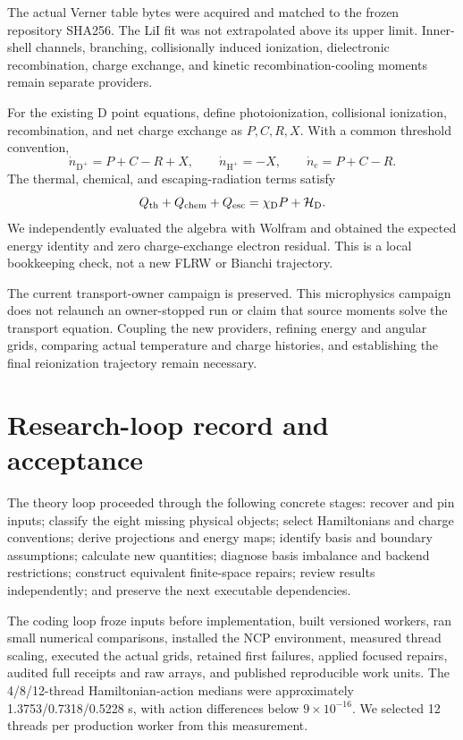 \documentclass[
  10pt,
]{article}
\begin{document}
The actual Verner table bytes were acquired and matched to the frozen
repository SHA256. The LiI fit was not extrapolated above its upper
limit. Inner-shell channels, branching, collisionally induced
ionization, dielectronic recombination, charge exchange, and kinetic
recombination-cooling moments remain separate providers.

For the existing D point equations, define photoionization, collisional
ionization, recombination, and net charge exchange as \(P,C,R,X\). With
a common threshold convention, \[
\dot n_{\mathrm D^+}=P+C-R+X,\qquad
\dot n_{\mathrm H^+}=-X,\qquad
\dot n_e=P+C-R.
\] The thermal, chemical, and escaping-radiation terms satisfy \[
Q_{\rm th}+Q_{\rm chem}+Q_{\rm esc}
=\chi_{\rm D}P+\mathcal H_{\rm D}.
\] We independently evaluated the algebra with Wolfram and obtained the
expected energy identity and zero charge-exchange electron residual.
This is a local bookkeeping check, not a new FLRW or Bianchi trajectory.

The current transport-owner campaign is preserved. This microphysics
campaign does not relaunch an owner-stopped run or claim that source
moments solve the transport equation. Coupling the new providers,
refining energy and angular grids, comparing actual temperature and
charge histories, and establishing the final reionization trajectory
remain necessary.

\hypertarget{research-loop-record-and-acceptance}{%
\section{Research-loop record and
acceptance}\label{research-loop-record-and-acceptance}}

The theory loop proceeded through the following concrete stages: recover
and pin inputs; classify the eight missing physical objects; select
Hamiltonians and charge conventions; derive projections and energy maps;
identify basis and boundary assumptions; calculate new quantities;
diagnose basis imbalance and backend restrictions; construct equivalent
finite-space repairs; review results independently; and preserve the
next executable dependencies.

The coding loop froze inputs before implementation, built versioned
workers, ran small numerical comparisons, installed the NCP environment,
measured thread scaling, executed the actual grids, retained first
failures, applied focused repairs, audited full receipts and raw arrays,
and published reproducible work units. The 4/8/12-thread
Hamiltonian-action medians were approximately 1.3753/0.7318/0.5228 s,
with action differences below \(9\times10^{-16}\). We selected 12
threads per production worker from this measurement.
\end{document}

